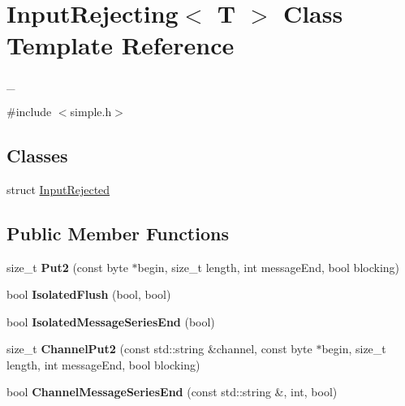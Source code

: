 \hypertarget{class_input_rejecting}{
\section{InputRejecting$<$ T $>$ Class Template Reference}
\label{class_input_rejecting}
}


\_\-  


{\ttfamily \#include $<$simple.h$>$}\subsection*{Classes}
\begin{DoxyCompactItemize}
\item 
struct \hyperlink{struct_input_rejecting_1_1_input_rejected}{InputRejected}
\end{DoxyCompactItemize}
\subsection*{Public Member Functions}
\begin{DoxyCompactItemize}
\item 
\hypertarget{class_input_rejecting_a0ff99108aa0d11f44a0ca49d056bc7cb}{
size\_\-t {\bfseries Put2} (const byte $\ast$begin, size\_\-t length, int messageEnd, bool blocking)}
\label{class_input_rejecting_a0ff99108aa0d11f44a0ca49d056bc7cb}

\item 
\hypertarget{class_input_rejecting_a08379573273dfdcd11cee9197aa4145d}{
bool {\bfseries IsolatedFlush} (bool, bool)}
\label{class_input_rejecting_a08379573273dfdcd11cee9197aa4145d}

\item 
\hypertarget{class_input_rejecting_a280c87e06b662437b0f0a8ccd38cacfb}{
bool {\bfseries IsolatedMessageSeriesEnd} (bool)}
\label{class_input_rejecting_a280c87e06b662437b0f0a8ccd38cacfb}

\item 
\hypertarget{class_input_rejecting_a2445d67fed0e8f26e1615562e1af12e7}{
size\_\-t {\bfseries ChannelPut2} (const std::string \&channel, const byte $\ast$begin, size\_\-t length, int messageEnd, bool blocking)}
\label{class_input_rejecting_a2445d67fed0e8f26e1615562e1af12e7}

\item 
\hypertarget{class_input_rejecting_a2db8ebe3e67f20b3fc92252de9e96cf6}{
bool {\bfseries ChannelMessageSeriesEnd} (const std::string \&, int, bool)}
\label{class_input_rejecting_a2db8ebe3e67f20b3fc92252de9e96cf6}

\end{DoxyCompactItemize}


